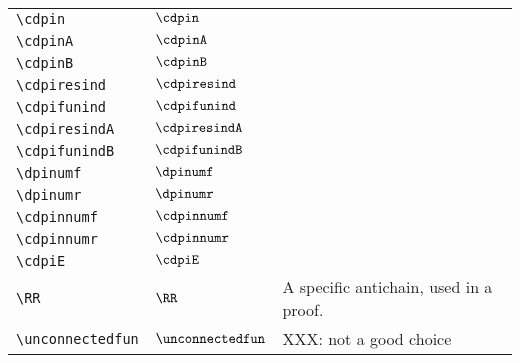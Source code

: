 \begin{longtable}{lll}
  {\color[rgb]{0.5,0.5,0.5}\texttt{\textbackslash cdpin}}                                                   & $\cdpin$                   & \\
  {\color[rgb]{0.5,0.5,0.5}\texttt{\textbackslash cdpinA}}                                                  & $\cdpinA$                  & \\
  {\color[rgb]{0.5,0.5,0.5}\texttt{\textbackslash cdpinB}}                                                  & $\cdpinB$                  & \\
  {\color[rgb]{0.5,0.5,0.5}\texttt{\textbackslash cdpiresind}}                                              & $\cdpiresind$              & \\
  {\color[rgb]{0.5,0.5,0.5}\texttt{\textbackslash cdpifunind}}                                              & $\cdpifunind$              & \\
  {\color[rgb]{0.5,0.5,0.5}\texttt{\textbackslash cdpiresindA}}                                             & $\cdpiresindA$             & \\
  {\color[rgb]{0.5,0.5,0.5}\texttt{\textbackslash cdpifunindB}}                                             & $\cdpifunindB$             & \\
  {\color[rgb]{0.5,0.5,0.5}\texttt{\textbackslash dpinumf}}                                                 & $\dpinumf$                 & \\
  {\color[rgb]{0.5,0.5,0.5}\texttt{\textbackslash dpinumr}}                                                 & $\dpinumr$                 & \\
  {\color[rgb]{0.5,0.5,0.5}\texttt{\textbackslash cdpinnumf}}                                               & $\cdpinnumf$               & \\
  {\color[rgb]{0.5,0.5,0.5}\texttt{\textbackslash cdpinnumr}}                                               & $\cdpinnumr$               & \\
  {\color[rgb]{0.5,0.5,0.5}\texttt{\textbackslash cdpiE}}                                                   & $\cdpiE$                   & \\
  {\color[rgb]{0.5,0.5,0.5}\texttt{\textbackslash RR}}                                                      & $\RR$                      & A specific antichain, used in a proof.\\
  {\color[rgb]{0.5,0.5,0.5}\texttt{\textbackslash unconnectedfun}}                                          & $\unconnectedfun$
  & XXX: not a good choice\\

\end{longtable}
